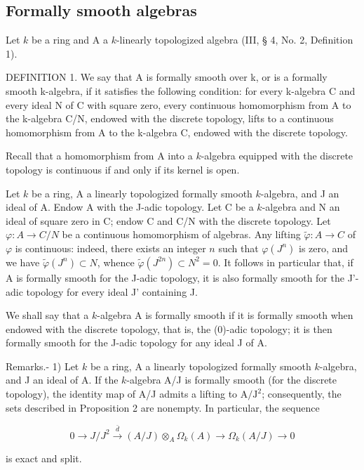 \subsection{Formally smooth algebras}

Let \(k\) be a ring and A a \(k\)-linearly topologized algebra (III, § 4, No. 2, Definition 1).

DEFINITION 1. We say that A is formally smooth over k, or is a formally smooth k-algebra, if it satisfies the following condition: for every k-algebra C and every ideal N of C with square zero, every continuous homomorphism from A to the k-algebra C/N, endowed with the discrete topology, lifts to a continuous homomorphism from A to the k-algebra C, endowed with the discrete topology.

Recall that a homomorphism from A into a \(k\)-algebra equipped with the discrete topology is continuous if and only if its kernel is open.

Let \(k\) be a ring, A a linearly topologized formally smooth \(k\)-algebra, and J an ideal of A. Endow A with the J-adic topology. Let C be a \(k\)-algebra and N an ideal of square zero in C; endow C and C/N with the discrete topology. Let \(\varphi : A \to C/N\) be a continuous homomorphism of algebras. Any lifting \(\tilde{\varphi} : A \to C\) of \(\varphi\) is continuous: indeed, there exists an integer \(n\) such that \(\varphi(J^n)\) is zero, and we have \(\tilde{\varphi}(J^n) \subset N\), whence \(\tilde{\varphi}(J^{2n}) \subset N^2 = 0\). It follows in particular that, if A is formally smooth for the J-adic topology, it is also formally smooth for the J'-adic topology for every ideal J' containing J.

We shall say that a \(k\)-algebra A is formally smooth if it is formally smooth when endowed with the discrete topology, that is, the (0)-adic topology; it is then formally smooth for the J-adic topology for any ideal J of A.

Remarks.- 1) Let \(k\) be a ring, A a linearly topologized formally smooth \(k\)-algebra, and J an ideal of A. If the \(k\)-algebra A/J is formally smooth (for the discrete topology), the identity map of A/J admits a lifting to \(\mathrm{A} / \mathrm{J}^2\); consequently, the sets described in Proposition 2 are nonempty. In particular, the sequence

\[
0 \to J / J ^ {2} \xrightarrow {\bar {d}} (A / J) \otimes_ {A} \Omega_ {k} (A) \longrightarrow \Omega_ {k} (A / J) \to 0
\]

is exact and split.

